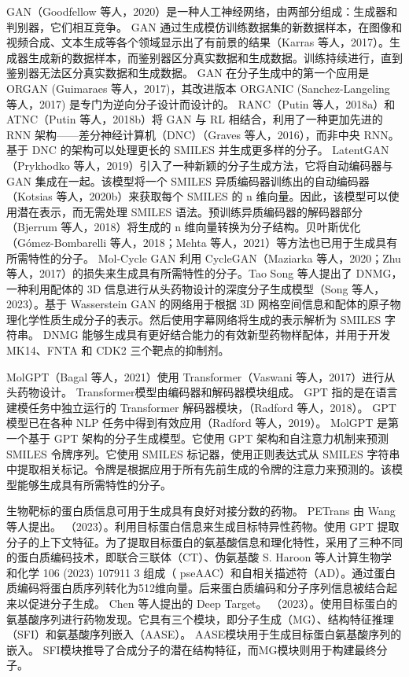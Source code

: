 GAN（Goodfellow 等人，2020）是一种人工神经网络，由两部分组成：生成器和判别器，它们相互竞争。 GAN 通过生成模仿训练数据集的新数据样本，在图像和视频合成、文本生成等各个领域显示出了有前景的结果（Karras 等人，2017）。生成器生成新的数据样本，而鉴别器区分真实数据和生成数据。训练持续进行，直到鉴别器无法区分真实数据和生成数据。 GAN 在分子生成中的第一个应用是 ORGAN (Guimaraes 等人，2017)，其改进版本 ORGANIC (Sanchez-Langeling 等人，2017) 是专门为逆向分子设计而设计的。 RANC（Putin 等人，2018a）和 ATNC（Putin 等人，2018b）将 GAN 与 RL 相结合，利用了一种更加先进的 RNN 架构——差分神经计算机（DNC）（Graves 等人，2016），而非中央 RNN。基于 DNC 的架构可以处理更长的 SMILES 并生成更多样的分子。
LatentGAN（Prykhodko 等人，2019）引入了一种新颖的分子生成方法，它将自动编码器与 GAN 集成在一起。该模型将一个 SMILES 异质编码器训练出的自动编码器（Kotsias 等人，2020b）来获取每个 SMILES 的 n 维向量。因此，该模型可以使用潜在表示，而无需处理 SMILES 语法。预训练异质编码器的解码器部分（Bjerrum 等人，2018）将生成的 n 维向量转换为分子结构。贝叶斯优化（Gómez-Bombarelli 等人，2018；Mehta 等人，2021）等方法也已用于生成具有所需特性的分子。 Mol-Cycle GAN 利用 CycleGAN（Maziarka 等人，2020；Zhu 等人，2017）的损失来生成具有所需特性的分子。Tao Song 等人提出了 DNMG，一种利用配体的 3D 信息进行从头药物设计的深度分子生成模型（Song 等人，2023）。基于 Wasserstein GAN 的网络用于根据 3D 网格空间信息和配体的原子物理化学性质生成分子的表示。然后使用字幕网络将生成的表示解析为 SMILES 字符串。 DNMG 能够生成具有更好结合能力的有效新型药物样配体，并用于开发 MK14、FNTA 和 CDK2 三个靶点的抑制剂。

MolGPT（Bagal 等人，2021）使用 Transformer（Vaswani 等人，2017）进行从头药物设计。 Transformer模型由编码器和解码器模块组成。 GPT 指的是在语言建模任务中独立运行的 Transformer 解码器模块，（Radford 等人，2018）。 GPT 模型已在各种 NLP 任务中得到有效应用（Radford 等人，2019）。 MolGPT 是第一个基于 GPT 架构的分子生成模型。它使用 GPT 架构和自注意力机制来预测 SMILES 令牌序列。它使用 SMILES 标记器，使用正则表达式从 SMILES 字符串中提取相关标记。令牌是根据应用于所有先前生成的令牌的注意力来预测的。该模型能够生成具有所需特性的分子。

生物靶标的蛋白质信息可用于生成具有良好对接分数的药物。 PETrans 由 Wang 等人提出。 （2023）。利用目标蛋白信息来生成目标特异性药物。使用 GPT 提取分子的上下文特征。为了提取目标蛋白的氨基酸信息和理化特性，采用了三种不同的蛋白质编码技术，即联合三联体（CT）、伪氨基酸 S. Haroon 等人计算生物学和化学 106 (2023) 107911 3 组成（ pseAAC）和自相关描述符（AD）。通过蛋白质编码将蛋白质序列转化为512维向量。后来蛋白质编码和分子序列信息被结合起来以促进分子生成。 Chen 等人提出的 Deep Target。 （2023）。使用目标蛋白的氨基酸序列进行药物发现。它具有三个模块，即分子生成（MG）、结构特征推理（SFI）和氨基酸序列嵌入（AASE）。 AASE模块用于生成目标蛋白氨基酸序列的嵌入。 SFI模块推导了合成分子的潜在结构特征，而MG模块则用于构建最终分子。

